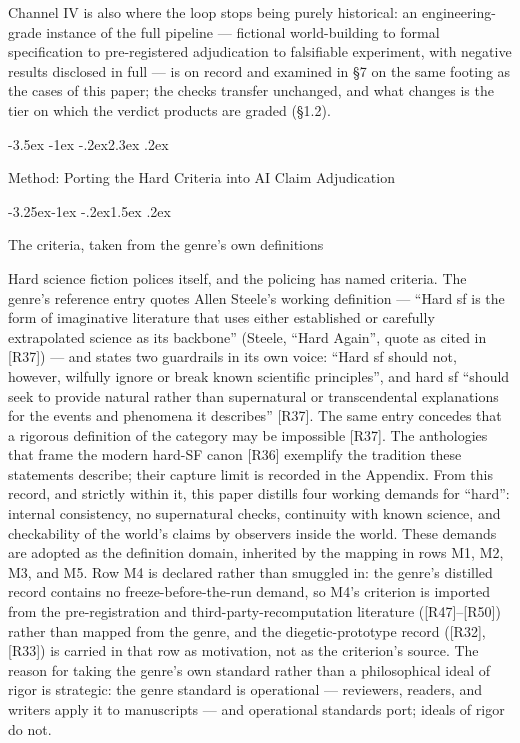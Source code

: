 \documentclass[11pt,a4paper]{article}
\makeatletter
\renewcommand\section{\@startsection{section}{1}{\z@}%
  {-3.5ex \@plus -1ex \@minus -.2ex}{2.3ex \@plus .2ex}%
  {\normalfont\Large\bfseries\raggedright}}
\renewcommand\subsection{\@startsection{subsection}{2}{\z@}%
  {-3.25ex\@plus -1ex \@minus -.2ex}{1.5ex \@plus .2ex}%
  {\normalfont\large\bfseries\raggedright}}
\makeatother
\begin{document}
Channel IV is also where the loop stops being purely historical: an engineering-grade instance of the full pipeline — fictional world-building to formal specification to pre-registered adjudication to falsifiable experiment, with negative results disclosed in full — is on record and examined in §7 on the same footing as the cases of this paper; the checks transfer unchanged, and what changes is the tier on which the verdict products are graded (§1.2).

\section{Method: Porting the Hard Criteria into AI Claim Adjudication}

\subsection{The criteria, taken from the genre's own definitions}

Hard science fiction polices itself, and the policing has named criteria. The genre's reference entry quotes Allen Steele's working definition — ``Hard sf is the form of imaginative literature that uses either established or carefully extrapolated science as its backbone'' (Steele, ``Hard Again'', quote as cited in [R37]) — and states two guardrails in its own voice: ``Hard sf should not, however, wilfully ignore or break known scientific principles'', and hard sf ``should seek to provide natural rather than supernatural or transcendental explanations for the events and phenomena it describes'' [R37]. The same entry concedes that a rigorous definition of the category may be impossible [R37]. The anthologies that frame the modern hard-SF canon [R36] exemplify the tradition these statements describe; their capture limit is recorded in the Appendix. From this record, and strictly within it, this paper distills four working demands for ``hard'': internal consistency, no supernatural checks, continuity with known science, and checkability of the world's claims by observers inside the world. These demands are adopted as the definition domain, inherited by the mapping in rows M1, M2, M3, and M5. Row M4 is declared rather than smuggled in: the genre's distilled record contains no freeze-before-the-run demand, so M4's criterion is imported from the pre-registration and third-party-recomputation literature ([R47]–[R50]) rather than mapped from the genre, and the diegetic-prototype record ([R32], [R33]) is carried in that row as motivation, not as the criterion's source. The reason for taking the genre's own standard rather than a philosophical ideal of rigor is strategic: the genre standard is operational — reviewers, readers, and writers apply it to manuscripts — and operational standards port; ideals of rigor do not.
\end{document}
